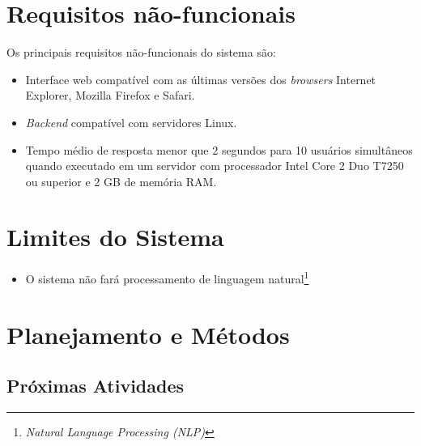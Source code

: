 \section{Requisitos não-funcionais}

Os principais requisitos não-funcionais do sistema são:

\begin{itemize}

    \item Interface web compatível com as últimas versões dos \textit{browsers} Internet Explorer, Mozilla Firefox e Safari.
    
    \item \textit{Backend} compatível com servidores Linux.

    \item Tempo médio de resposta menor que 2 segundos para 10 usuários simultâneos quando executado em um servidor com processador Intel Core 2 Duo T7250 ou superior e 2 GB de memória RAM. %

\end{itemize}

\section{Limites do Sistema}

\begin{itemize}
  
    \item O sistema não fará processamento de linguagem natural\footnote{\textit{Natural Language Processing (NLP)}}

\end{itemize}



\section{Planejamento e Métodos} %
\label{sec:planejamento_e_métodos}


\subsection{Próximas Atividades} %
\label{sub:próximas_atividades}

